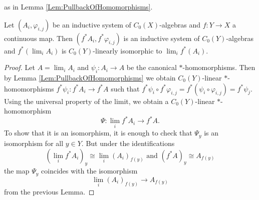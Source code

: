	as in Lemma \ref{Lem:PullbackOfHomomorphisms}. 
	\begin{prop}\label{Prop:LimitsAndPullbacks}
		Let $(A_i,\varphi_{i,j})$ be an inductive system of $C_0(X)$-al\-gebras and $f:Y\rightarrow X$ a continuous map.
		Then $(f^*A_i,f^*\varphi_{i,j})$ is an inductive system of $C_0(Y)$-algebras and $f^*(\lim_i A_i)$ is $C_0(Y)$-linearly isomorphic to $\lim_i f^*(A_i)$.
	\end{prop}
	\begin{proof}
		Let $A=\lim_i A_i$ and $\psi_i:A_i\rightarrow A$ be the canonical $\ast$-homo\-morphisms. Then by Lemma \ref{Lem:PullbackOfHomomorphisms} we obtain $C_0(Y)$-linear $*$-homo\-morphisms $f^*\psi_i:f^*A_i\rightarrow f^*A$ such that $f^*\psi_{i}\circ f^*\varphi_{i,j}=f^*(\psi_{i}\circ \varphi_{i,j})=f^*\psi_j$. Using the universal property of the limit, we obtain a $C_0(Y)$-linear $*$-homo\-morphism $$\Psi:\lim\limits_{i}f^*A_i\rightarrow f^*A.$$
		To show that it is an isomorphism, it is enough to check that $\Psi_y$ is an isomorphism for all $y\in Y$. But under the identifications
		$$(\lim_{i}f^*A_i)_y\cong \lim_{i}(A_i)_{f(y)}\text{ and }(f^*A)_y\cong A_{f(y)}$$ the map $\Psi_y$ coincides with the isomorphism 
		$$\lim\limits_{i}(A_i)_{f(y)}\rightarrow A_{f(y)}$$
		from the previous Lemma.
	\end{proof}
	
